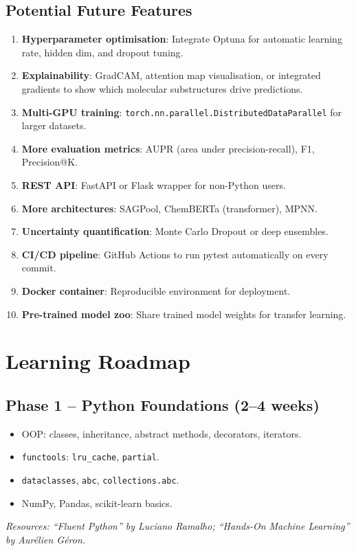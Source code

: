 \documentclass[12pt,a4paper,oneside]{book}
\begin{document}
\section{Potential Future Features}

\begin{enumerate}
  \item \textbf{Hyperparameter optimisation}: Integrate Optuna for automatic learning rate, hidden dim, and dropout tuning.
  \item \textbf{Explainability}: GradCAM, attention map visualisation, or integrated gradients to show which molecular substructures drive predictions.
  \item \textbf{Multi-GPU training}: \texttt{torch.nn.parallel.DistributedDataParallel} for larger datasets.
  \item \textbf{More evaluation metrics}: AUPR (area under precision-recall), F1, Precision@K.
  \item \textbf{REST API}: FastAPI or Flask wrapper for non-Python users.
  \item \textbf{More architectures}: SAGPool, ChemBERTa (transformer), MPNN.
  \item \textbf{Uncertainty quantification}: Monte Carlo Dropout or deep ensembles.
  \item \textbf{CI/CD pipeline}: GitHub Actions to run pytest automatically on every commit.
  \item \textbf{Docker container}: Reproducible environment for deployment.
  \item \textbf{Pre-trained model zoo}: Share trained model weights for transfer learning.
\end{enumerate}

\chapter{Learning Roadmap}\label{chap:learning}

\section{Phase 1 -- Python Foundations (2--4 weeks)}
\begin{itemize}
  \item OOP: classes, inheritance, abstract methods, decorators, iterators.
  \item \texttt{functools}: \texttt{lru\_cache}, \texttt{partial}.
  \item \texttt{dataclasses}, \texttt{abc}, \texttt{collections.abc}.
  \item NumPy, Pandas, scikit-learn basics.
\end{itemize}
\textit{Resources: ``Fluent Python'' by Luciano Ramalho; ``Hands-On Machine Learning'' by Aur\'elien G\'eron.}
\end{document}

